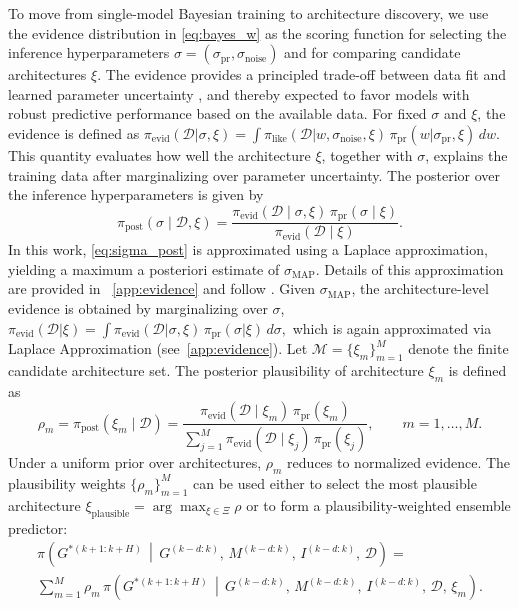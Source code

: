 \documentclass[preprint,12pt]{elsarticle}
\begin{document}
To move from single-model Bayesian training to architecture discovery, we use the evidence distribution in \eqref{eq:bayes_w} as the scoring function for selecting the inference hyperparameters \(\sigma=(\sigma_{\mathrm{pr}},\sigma_{\mathrm{noise}})\) and for comparing candidate architectures $\xi$. The evidence provides a principled trade-off between data fit and learned parameter uncertainty \cite{mackay1995probable, singh2024framework, immer2021scalable}, and thereby expected to favor models with robust predictive performance based on the available data.
%
For fixed \(\sigma\) and \(\xi\), the evidence is defined as
$
\pi_{\mathrm{evid}}(\mathcal{D} | \sigma,\xi)
=
\int
\pi_{\mathrm{like}}(\mathcal{D} | w,\sigma_{\mathrm{noise}},\xi)\,
\pi_{\mathrm{pr}}(w | \sigma_{\mathrm{pr}},\xi)\,dw.
$
This quantity evaluates how well the architecture \(\xi\), together with \(\sigma\), explains the training data after marginalizing over parameter uncertainty. The posterior over the inference hyperparameters is given by
\begin{equation}
\pi_{\mathrm{post}}(\sigma\mid \mathcal{D},\xi)
=
\frac{
\pi_{\mathrm{evid}}(\mathcal{D}\mid \sigma,\xi)\,
\pi_{\mathrm{pr}}(\sigma\mid \xi)
}{
\pi_{\mathrm{evid}}(\mathcal{D}\mid \xi)
}.
\label{eq:sigma_post}
\end{equation}
%
In this work, \eqref{eq:sigma_post} is approximated using a Laplace approximation, yielding a maximum a posteriori estimate of \(\sigma_{\mathrm{MAP}}\). Details of this approximation are provided in ~\ref{app:evidence} and follow \cite{singh2024framework}.
%
Given \(\sigma_{\mathrm{MAP}}\), the architecture-level evidence is obtained by marginalizing over \(\sigma\),
$
\pi_{\mathrm{evid}}(\mathcal{D}| \xi)
=
\int
\pi_{\mathrm{evid}}(\mathcal{D} | \sigma,\xi)\,
\pi_{\mathrm{pr}}(\sigma | \xi)\,d\sigma,
$
which is again approximated via Laplace Approximation (see~\ref{app:evidence}).
%
Let \(\mathcal{M}=\{\xi_m\}_{m=1}^{M}\) denote the finite candidate architecture set. The posterior plausibility of architecture \(\xi_m\) is defined as
\begin{equation}
\rho_m
=
\pi_{\mathrm{post}}(\xi_m\mid \mathcal{D})
=
\frac{
\pi_{\mathrm{evid}}(\mathcal{D}\mid \xi_m)\,
\pi_{\mathrm{pr}}(\xi_m)
}{
\sum_{j=1}^{M}
\pi_{\mathrm{evid}}(\mathcal{D}\mid \xi_j)\,
\pi_{\mathrm{pr}}(\xi_j)
},
\qquad m=1,\ldots,M.
\label{eq:rho_m}
\end{equation}
Under a uniform prior over architectures, \(\rho_m\) reduces to normalized evidence.
%
The plausibility weights \(\{\rho_m\}_{m=1}^{M}\) can be used either to select the most plausible architecture $\xi_{\mathrm{plausible}}=\arg\max_{\xi \in \Xi} \rho$ or to form a plausibility-weighted ensemble predictor:
\begin{eqnarray}
\pi\!\left(
G^{* (k+1:k+H)}
\,\middle|\,
G^{(k-d:k)},\,M^{(k-d:k)},\,I^{(k-d:k)},\,\mathcal{D}
\right) =
\nonumber \\
\sum_{m=1}^{M}
\rho_m\,
\pi\!\left(
G^{* (k+1:k+H)}
\,\middle|\,
G^{(k-d:k)},\,M^{(k-d:k)},\,I^{(k-d:k)},\,\mathcal{D},\,\xi_m
\right).
\label{eq:bma}
\end{eqnarray}
\end{document}
